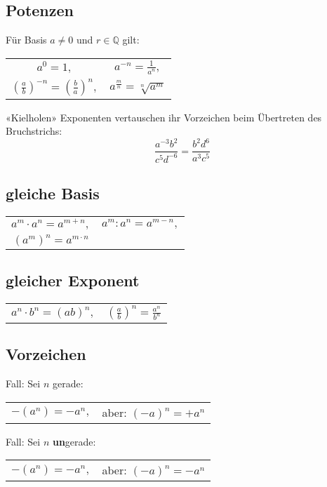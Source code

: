 \begin{multicols}{2}
\section{Potenzen}
Für Basis $a\ne 0$ und $r\in\mathbb{Q}$ gilt:

\begin{tabular}{cc}
$a^0=1,$ & $a^{-n} = \frac1{a^n},$  \\
$\left(\frac{a}b\right)^{-n} = \left(\frac{b}a\right)^n,$ & $a^{\frac{m}n} = \sqrt[n]{a^m}$\\
 \end{tabular}

\begin{rezept}{«Kielholen»}{}{}
Exponenten vertauschen ihr Vorzeichen beim Übertreten des Bruchstrichs:
$$\frac{a^{-3}b^2}{c^5d^{-6}} = \frac{b^2d^6}{a^3c^5}$$
\end{rezept}

\subsection{gleiche Basis}
\begin{tabular}{cc}
$a^m\cdot{}a^n = a^{m+n},$ & $a^m:a^n=a^{m-n},$ \\
$\left(a^m\right)^n = a^{m\cdot{}n}$ &\\
 \end{tabular} 

\subsection{gleicher Exponent}

\begin{tabular}{cc}
$a^n\cdot{}b^n = (ab)^n,$ & $\left(\frac{a}b\right)^n = \frac{a^n}{b^n}$\\
 \end{tabular}
 

\subsection{Vorzeichen}
Fall: Sei $n$ gerade:

\begin{tabular}{cc}
 $-(a^n) = -a^n,$ & aber: $(-a)^n = +a^n$\\
 \end{tabular} 

Fall: Sei $n$ \textbf{un}gerade:

\begin{tabular}{cc}
 $-(a^n) = -a^n,$ & aber: $(-a)^n = -a^n$\\
 \end{tabular} 



\end{multicols}
